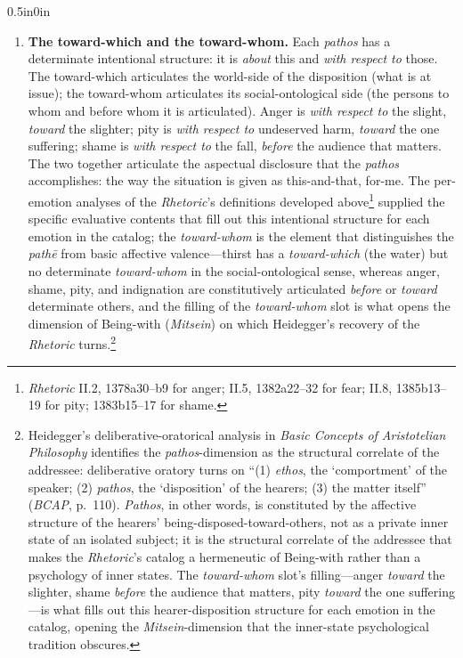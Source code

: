 \documentclass{article}
\begin{document}
\begin{adjustwidth}{0.5in}{0in}
\begin{enumerate}
        \item \textbf{The toward-which and the toward-whom.} Each \textit{pathos} has a determinate intentional structure: it is \textit{about} this and \textit{with respect to} those. The toward-which articulates the world-side of the disposition (what is at issue); the toward-whom articulates its social-ontological side (the persons to whom and before whom it is articulated). Anger is \textit{with respect to} the slight, \textit{toward} the slighter; pity is \textit{with respect to} undeserved harm, \textit{toward} the one suffering; shame is \textit{with respect to} the fall, \textit{before} the audience that matters. The two together articulate the aspectual disclosure that the \textit{pathos} accomplishes: the way the situation is given as this-and-that, for-me. The per-emotion analyses of the \textit{Rhetoric}'s definitions developed above\footnote{\textit{Rhetoric} II.2, 1378a30--b9 for anger; II.5, 1382a22--32 for fear; II.8, 1385b13--19 for pity; 1383b15--17 for shame.} supplied the specific evaluative contents that fill out this intentional structure for each emotion in the catalog; the \textit{toward-whom} is the element that distinguishes the \textit{pathē} from basic affective valence---thirst has a \textit{toward-which} (the water) but no determinate \textit{toward-whom} in the social-ontological sense, whereas anger, shame, pity, and indignation are constitutively articulated \textit{before} or \textit{toward} determinate others, and the filling of the \textit{toward-whom} slot is what opens the dimension of Being-with (\textit{Mitsein}) on which Heidegger's recovery of the \textit{Rhetoric} turns.\footnote{Heidegger's deliberative-oratorical analysis in \textit{Basic Concepts of Aristotelian Philosophy} identifies the \textit{pathos}-dimension as the structural correlate of the addressee: deliberative oratory turns on ``(1) \textit{ethos}, the `comportment' of the speaker; (2) \textit{pathos}, the `disposition' of the hearers; (3) the matter itself'' (\textit{BCAP}, p.~110). \textit{Pathos}, in other words, is constituted by the affective structure of the hearers' being-disposed-toward-others, not as a private inner state of an isolated subject; it is the structural correlate of the addressee that makes the \textit{Rhetoric}'s catalog a hermeneutic of Being-with rather than a psychology of inner states. The \textit{toward-whom} slot's filling---anger \textit{toward} the slighter, shame \textit{before} the audience that matters, pity \textit{toward} the one suffering---is what fills out this hearer-disposition structure for each emotion in the catalog, opening the \textit{Mitsein}-dimension that the inner-state psychological tradition obscures.}
              

\end{enumerate}
\end{adjustwidth}
\end{document}
